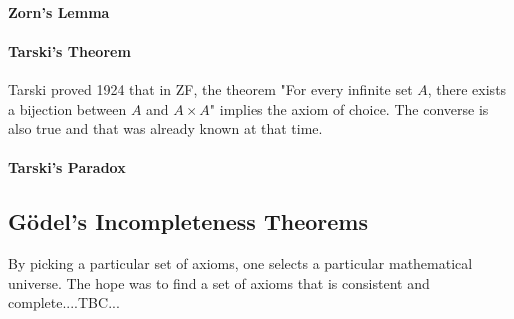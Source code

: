 

\paragraph{Zorn's Lemma}




\paragraph{Tarski's Theorem}
Tarski proved 1924 that in ZF, the theorem "For every infinite set $A$, there exists a bijection between $A$ and $A \times A$" implies the axiom of choice. The converse is also true and that was already known at that time. 






\paragraph{Tarski's Paradox}



\subsection{Gödel's Incompleteness Theorems}
By picking a particular set of axioms, one selects a particular mathematical universe. The hope was to find a set of axioms that is consistent and complete....TBC...


